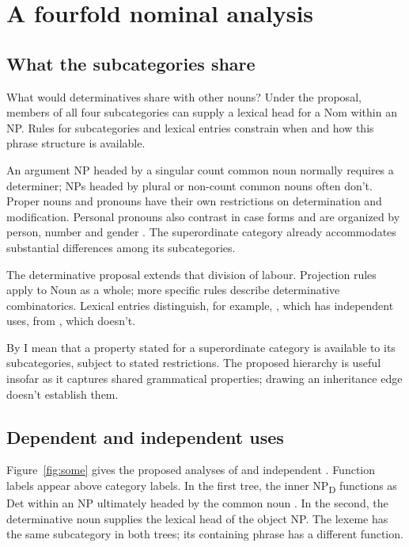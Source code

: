 \documentclass[12pt]{article}
\begin{document}
\section{A fourfold nominal analysis}\label{sec:proposal}

\subsection{What the subcategories share}

What would determinatives share with other nouns? Under the proposal, members of all four subcategories can supply a lexical head for a Nom within an NP. Rules for subcategories and lexical entries constrain when and how this phrase structure is available.

An argument NP headed by a singular count common noun normally requires a determiner; NPs headed by plural or non-count common nouns often don't. Proper nouns and pronouns have their own restrictions on determination and modification. Personal pronouns also contrast in case forms and are organized by person, number and gender \citep[425--427]{huddleston2002}. The superordinate category already accommodates substantial differences among its subcategories.

The determinative proposal extends that division of labour. Projection rules apply to Noun as a whole; more specific rules describe determinative combinatorics. Lexical entries distinguish, for example, , which has independent uses, from , which doesn't.

By  I mean that a property stated for a superordinate category is available to its subcategories, subject to stated restrictions. The proposed hierarchy is useful insofar as it captures shared grammatical properties; drawing an inheritance edge doesn't establish them.

\subsection{Dependent and independent uses}

Figure~\ref{fig:some} gives the proposed analyses of  and independent . Function labels appear above category labels. In the first tree, the inner NP\textsubscript{D} functions as Det within an NP ultimately headed by the common noun . In the second, the determinative noun  supplies the lexical head of the object NP. The lexeme has the same subcategory in both trees; its containing phrase has a different function.
\end{document}
